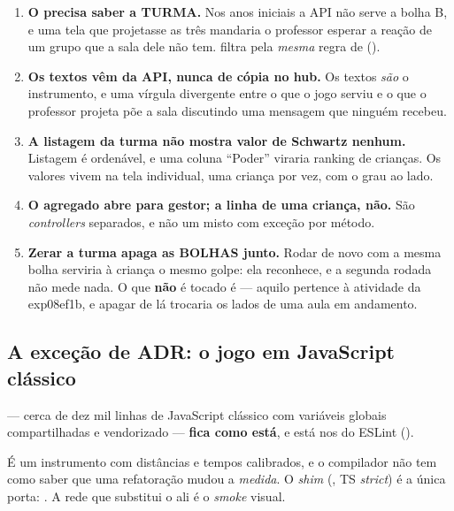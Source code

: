 \begin{regra}
\begin{enumerate}
  \item \textbf{O  precisa saber a TURMA.} Nos anos iniciais a API não
    serve a bolha B, e uma tela que projetasse as três mandaria o professor
    esperar a reação de um grupo que a sala dele não tem.
     filtra pela \emph{mesma} regra de
     ().
  \item \textbf{Os textos vêm da API, nunca de cópia no hub.} Os textos
    \emph{são} o instrumento, e uma vírgula divergente entre o que o jogo serviu e
    o que o professor projeta põe a sala discutindo uma mensagem que ninguém
    recebeu.
  \item \textbf{A listagem da turma não mostra valor de Schwartz nenhum.}
    Listagem é ordenável, e uma coluna \enquote{Poder} viraria ranking de
    crianças. Os valores vivem na tela individual, uma criança por vez, com o
    grau ao lado.
  \item \textbf{O agregado abre para gestor; a linha de uma criança, não.} São
    \emph{controllers} separados, e não um  misto com exceção por
    método.
  \item \textbf{Zerar a turma apaga as BOLHAS junto.} Rodar de novo com a mesma
    bolha serviria à criança o mesmo golpe: ela reconhece, e a segunda rodada não
    mede nada. O que \textbf{não} é tocado é
     --- aquilo pertence à atividade da
    exp08ef1b, e apagar de lá trocaria os lados de uma aula em andamento.
\end{enumerate}
\end{regra}

\subsection{A exceção de ADR: o jogo em JavaScript clássico}

\begin{decisao}
 --- cerca de dez mil
linhas de JavaScript clássico com variáveis globais compartilhadas e
 vendorizado --- \textbf{fica como está}, e está nos
 do ESLint ().

É um instrumento com distâncias e tempos calibrados, e o compilador não tem como
saber que uma refatoração mudou a \emph{medida}. O \emph{shim} (, TS
\emph{strict}) é a única porta: . A rede que substitui o
 ali é o \emph{smoke} visual.
\end{decisao}

